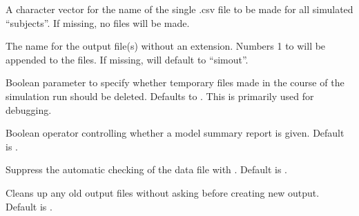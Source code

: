 \documentclass[a4paper]{book}
\begin{document}
\begin{Arguments}
\begin{ldescription}
\item[\code{makecsv}] A character vector for the name of the single .csv file to be made for all simulated
``subjects''.  If missing, no files will be made.

\item[\code{outname}] The name for the output file(s) without an extension.  Numbers 1 to  will be appended to the files.
If missing, will default to ``simout''.

\item[\code{clean}] Boolean parameter to specify whether temporary files made in the course of the simulation run should
be deleted. Defaults to .  This is primarily used for debugging.

\item[\code{silent}] Boolean operator controlling whether a model summary report is given.  Default is .

\item[\code{nocheck}] Suppress the automatic checking of the data file with .  Default is .

\item[\code{overwrite}] Cleans up any old output files without asking before creating new output. Default is .
\end{ldescription}
\end{Arguments}
%
\end{document}
